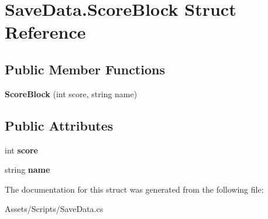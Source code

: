 \hypertarget{struct_save_data_1_1_score_block}{}\section{Save\+Data.\+Score\+Block Struct Reference}
\label{struct_save_data_1_1_score_block}
\subsection*{Public Member Functions}
\begin{DoxyCompactItemize}
\item 
{\bfseries Score\+Block} (int score, string name)\hypertarget{struct_save_data_1_1_score_block_a3ca084139639f3dce178c7d187315acf}{}\label{struct_save_data_1_1_score_block_a3ca084139639f3dce178c7d187315acf}

\end{DoxyCompactItemize}
\subsection*{Public Attributes}
\begin{DoxyCompactItemize}
\item 
int {\bfseries score}\hypertarget{struct_save_data_1_1_score_block_a334fa2ff8427ba7af6989ad28aceea03}{}\label{struct_save_data_1_1_score_block_a334fa2ff8427ba7af6989ad28aceea03}

\item 
string {\bfseries name}\hypertarget{struct_save_data_1_1_score_block_abd747ee96d8c50126232fe3d33b12682}{}\label{struct_save_data_1_1_score_block_abd747ee96d8c50126232fe3d33b12682}

\end{DoxyCompactItemize}


The documentation for this struct was generated from the following file\+:\begin{DoxyCompactItemize}
\item 
Assets/\+Scripts/Save\+Data.\+cs\end{DoxyCompactItemize}
